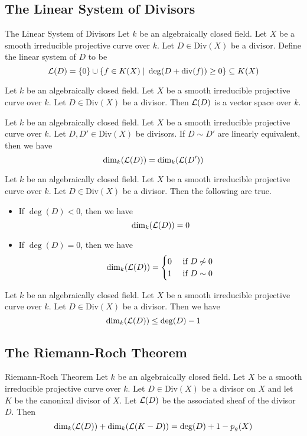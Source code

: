 \documentclass[a4paper]{article}
\begin{document}
\subsection{The Linear System of Divisors}
\begin{defn}{The Linear System of Divisors}{} Let $k$ be an algebraically closed field. Let $X$ be a smooth irreducible projective curve over $k$. Let $D\in\text{Div}(X)$ be a divisor. Define the linear system of $D$ to be $$\mathcal{L}(D)=\{0\}\cup\{f\in K(X)\;|\;\deg(D+\text{div}(f))\geq 0\}\subseteq K(X)$$
\end{defn}

\begin{lmm}{}{} Let $k$ be an algebraically closed field. Let $X$ be a smooth irreducible projective curve over $k$. Let $D\in\text{Div}(X)$ be a divisor. Then $\mathcal{L}(D)$ is a vector space over $k$. 
\end{lmm}

\begin{prp}{}{} Let $k$ be an algebraically closed field. Let $X$ be a smooth irreducible projective curve over $k$. Let $D,D'\in\text{Div}(X)$ be divisors. If $D\sim D'$ are linearly equivalent, then we have $$\dim_k(\mathcal{L}(D))=\dim_k(\mathcal{L}(D'))$$
\end{prp}

\begin{prp}{}{} Let $k$ be an algebraically closed field. Let $X$ be a smooth irreducible projective curve over $k$. Let $D\in\text{Div}(X)$ be a divisor. Then the following are true. 
\begin{itemize}
\item If $\deg(D)<0$, then we have $$\dim_k(\mathcal{L}(D))=0$$
\item If $\deg(D)=0$, then we have $$\dim_k(\mathcal{L}(D))=\begin{cases}
0 & \text{ if }D\not\sim0\\
1 & \text{ if }D\sim 0
\end{cases}$$
\end{itemize}
\end{prp}

\begin{prp}{}{} Let $k$ be an algebraically closed field. Let $X$ be a smooth irreducible projective curve over $k$. Let $D\in\text{Div}(X)$ be a divisor. Then we have $$\dim_k(\mathcal{L}(D))\leq\deg(D)-1$$
\end{prp}

\subsection{The Riemann-Roch Theorem}
\begin{thm}{Riemann-Roch Theorem}{} Let $k$ be an algebraically closed field. Let $X$ be a smooth irreducible projective curve over $k$. Let $D\in\text{Div}(X)$ be a divisor on $X$ and let $K$ be the canonical divisor of $X$. Let $\mathcal{L}(D)$ be the associated sheaf of the divisor $D$. Then $$\dim_k(\mathcal{L}(D))+\dim_k(\mathcal{L}(K-D))=\deg(D)+1-p_g(X)$$
\end{thm}
\end{document}
